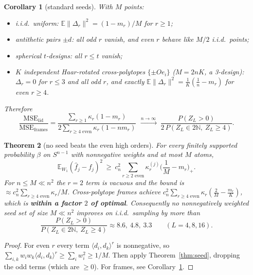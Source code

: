 \documentclass[11pt]{article}
\newtheorem{theorem}{Theorem}[section]
\newtheorem{corollary}[theorem]{Corollary}
\theoremstyle{definition}
\theoremstyle{remark}
\newcommand{\N}{\mathbb N}
\newcommand{\E}{\mathbb E}
\begin{document}
\begin{corollary}[standard seeds]\label{cor:seeds}
With $M$ points:
\begin{itemize}
\item i.i.d.\ uniform: $\E\|\Delta_r\|^2=(1-m_r)/M$ for $r\ge1$;
\item antithetic pairs $\pm d$: all odd $r$ vanish, and even $r$ behave like $M/2$ i.i.d.\ points;
\item spherical $t$-designs: all $r\le t$ vanish;
\item $K$ independent Haar-rotated cross-polytopes $\{\pm Oe_i\}$ ($M=2nK$, a 3-design): $\Delta_r=0$ for $r\le3$ and all odd $r$, and exactly $\E\|\Delta_r\|^2=\frac1K(\frac1n-m_r)$ for even $r\ge4$.
\end{itemize}
Therefore
\[\frac{\text{MSE}_{\text{iid}}}{\text{MSE}_{\text{frames}}}=\frac{\sum_{r\ge1}\kappa_r(1-m_r)}{2\sum_{r\ge4\text{ even}}\kappa_r(1-nm_r)}\ \xrightarrow{\ n\to\infty\ }\ \frac{P(Z_L>0)}{2\,P(Z_L\in2\N,\ Z_L\ge4)}.\]
\end{corollary}

\begin{theorem}[no seed beats the even high orders]\label{thm:lower}
For every finitely supported probability $\beta$ on $S^{n-1}$ with nonnegative weights and at most $M$ atoms,
\[\E_{W_1}(\hat f_j-f_j)^2\ \ge\ c_n^2\sum_{r\ge2\text{ even}}\kappa_r^{(j)}\Big(\frac1M-m_r\Big)_+.\]
For $n\le M\ll n^2$ the $r=2$ term is vacuous and the bound is $\approx c_n^2\sum_{r\ge4\text{ even}}\kappa_r/M$. Cross-polytope frames achieve $c_n^2\sum_{r\ge4\text{ even}}\kappa_r(\frac2M-\frac{m_r}K)$, which is \textbf{within a factor $2$ of optimal}. Consequently no nonnegatively weighted seed set of size $M\ll n^2$ improves on i.i.d.\ sampling by more than
\[\frac{P(Z_L>0)}{P(Z_L\in2\N,\ Z_L\ge4)}\approx 8.6,\ 4.8,\ 3.3\qquad(L=4,8,16).\]
\end{theorem}

\begin{proof}
For even $r$ every term $\langle d_i,d_k\rangle^r$ is nonnegative, so $\sum_{i,k}w_iw_k\langle d_i,d_k\rangle^r\ge\sum_iw_i^2\ge1/M$. Then apply Theorem~\ref{thm:seed}, dropping the odd terms (which are $\ge0$). For frames, see Corollary~\ref{cor:seeds}.
\end{proof}
\end{document}
